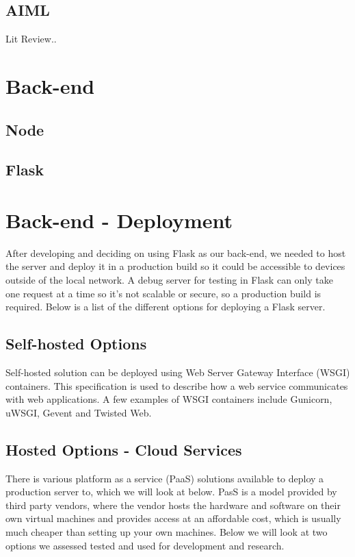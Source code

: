 \subsection{AIML}
Lit Review..

\section{Back-end}
\subsection{Node}
\subsection{Flask}

\section{Back-end - Deployment}
After developing and deciding on using Flask as our back-end, we needed to host the server and deploy it in a production build so it could be accessible to devices outside of the local network. A debug server for testing in Flask can only take one request at a time so it's not scalable or secure, so a production build is required. Below is a list of the different options for deploying a Flask server.

\subsection{Self-hosted Options}
Self-hosted solution can be deployed using Web Server Gateway Interface (WSGI) containers. This specification is used to describe how a web service communicates with web applications. A few examples of WSGI containers include Gunicorn, uWSGI, Gevent and Twisted Web.

\subsection{Hosted Options - Cloud Services}
There is various platform as a service (PaaS) solutions available to deploy a production server to, which we will look at below. PasS is a model provided by third party vendors, where the vendor hosts the hardware and software on their own virtual machines and provides access at an affordable cost, which is usually much cheaper than setting up your own machines. Below we will look at two options we assessed tested and used for development and research.

